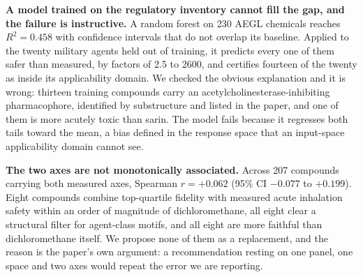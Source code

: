 \documentclass[11pt,a4paper]{article}
\begin{document}
\textbf{A model trained on the regulatory inventory cannot fill the gap, and the
failure is instructive.} A random forest on 230 AEGL chemicals reaches
$R^{2}=0.458$ with confidence intervals that do not overlap its baseline. Applied
to the twenty military agents held out of training, it predicts every one of them
safer than measured, by factors of 2.5 to 2600, and certifies fourteen of the
twenty as inside its applicability domain. We checked the obvious explanation and
it is wrong: thirteen training compounds carry an acetylcholinesterase-inhibiting
pharmacophore, identified by substructure and listed in the paper, and one of
them is more acutely toxic than sarin. The model fails because it regresses both
tails toward the mean, a bias defined in the response space that an input-space
applicability domain cannot see.

\textbf{The two axes are not monotonically associated.} Across 207 compounds
carrying both measured axes, Spearman $r = +0.062$ (95\% CI $-0.077$ to
$+0.199$). Eight
compounds combine top-quartile fidelity with measured acute inhalation safety
within an order of magnitude of dichloromethane, all eight clear a structural
filter for agent-class motifs, and all eight are more faithful than
dichloromethane itself. We propose none of them as a replacement, and the reason
is the paper's own argument: a recommendation resting on one panel, one space and
two axes would repeat the error we are reporting.
\end{document}
